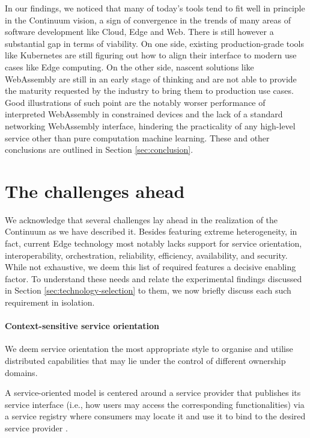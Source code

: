 In our findings, we noticed that many of today's tools tend to fit well in principle in the Continuum vision, a sign of convergence in the trends of many areas of software development like Cloud, Edge and Web. There is still however a substantial gap in terms of viability. On one side, existing production-grade tools like Kubernetes are still figuring out how to align their interface to modern use cases like Edge computing. On the other side, nascent solutions like WebAssembly are still in an early stage of thinking and are not able to provide the maturity requested by the industry to bring them to production use cases. Good illustrations of such point are the notably worser performance of interpreted WebAssembly in constrained devices and the lack of a standard networking WebAssembly interface, hindering the practicality of any high-level service other than pure computation machine learning. These and other conclusions are outlined in Section \ref{sec:conclusion}.

\section{The challenges ahead}
\label{sec:challenges}

We acknowledge that several challenges lay ahead in the realization of the Continuum as we have described it. 
Besides featuring extreme heterogeneity, in fact, current Edge technology most notably lacks support for service orientation, interoperability, orchestration, reliability, efficiency, availability, and security.
While not exhaustive, we deem this list of required features a decisive enabling factor.
To understand these needs and relate the experimental findings discussed in Section \ref{sec:technology-selection} to them, we now briefly discuss each such requirement in isolation. 

\paragraph{Context-sensitive service orientation}
We deem service orientation the most appropriate style to organise and utilise distributed capabilities that may lie under the control of different ownership domains. 

A service-oriented model is centered around a service provider that publishes its service interface (i.e., how users may access the corresponding functionalities) via a service registry where consumers may locate it and use it to bind to the desired service provider \cite{haller2008internet}.

